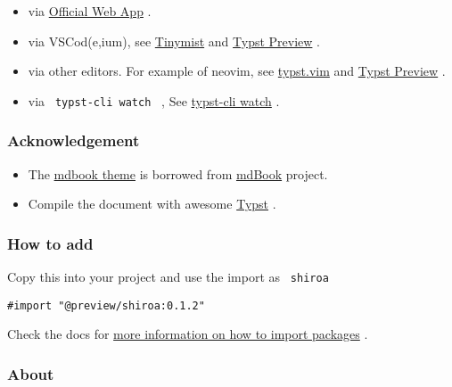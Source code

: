 \begin{itemize}
\item
  via \href{https://typst.app/}{Official Web App} .
\item
  via VSCod(e,ium), see
  \href{https://marketplace.visualstudio.com/items?itemName=myriad-dreamin.tinymist}{Tinymist}
  and
  \href{https://marketplace.visualstudio.com/items?itemName=mgt19937.typst-preview}{Typst
  Preview} .
\item
  via other editors. For example of neovim, see
  \href{https://github.com/kaarmu/typst.vim}{typst.vim} and
  \href{https://github.com/Enter-tainer/typst-preview\#use-without-vscode}{Typst
  Preview} .
\item
  via \texttt{\ typst-cli\ watch\ } , See
  \href{https://github.com/typst/typst\#usage}{typst-cli watch} .
\end{itemize}

\subsubsection{Acknowledgement}\label{acknowledgement}

\begin{itemize}
\item
  The
  \href{https://github.com/typst/packages/raw/main/packages/preview/shiroa/0.1.2/themes/mdbook/}{mdbook
  theme} is borrowed from
  \href{https://github.com/rust-lang/mdBook/tree/master/src/theme}{mdBook}
  project.
\item
  Compile the document with awesome
  \href{https://github.com/typst/typst}{Typst} .
\end{itemize}

\subsubsection{How to add}\label{how-to-add}

Copy this into your project and use the import as \texttt{\ shiroa\ }

\begin{verbatim}
#import "@preview/shiroa:0.1.2"
\end{verbatim}



Check the docs for
\href{https://typst.app/docs/reference/scripting/\#packages}{more
information on how to import packages} .

\subsubsection{About}\label{about}

